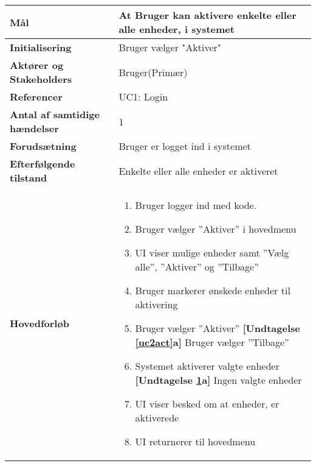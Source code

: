 \begin{table}[H] \centering
	\begin{tabular} {|p{6cm}|p{8cm}|}
	\hline		
		\textbf{Mål}							&At Bruger kan aktivere enkelte eller alle enheder, i systemet\\\hline
		\textbf{Initialisering}				&Bruger vælger "Aktiver" 	\\\hline
		\textbf{Aktører og Stakeholders}		&Bruger(Primær) 				\\\hline
		\textbf{Referencer}					&UC1: Login					\\\hline
		\textbf{Antal af samtidige hændelser}&1 							\\\hline
		\textbf{Forudsætning}				&Bruger er logget ind i systemet\\\hline
		\textbf{Efterfølgende tilstand}		&Enkelte eller alle enheder er aktiveret  \\\hline
		\textbf{Hovedforløb}					
			&\begin{enumerate}
	
				\item \label{uc2login} Bruger logger ind med kode.
					
				\item Bruger vælger ''Aktiver'' i hovedmenu
										
				\item \label{uc2menu}UI viser mulige enheder samt ''Vælg alle'', ''Aktiver'' og ''Tilbage''
												
				\item Bruger markerer ønskede enheder til aktivering
												
				\item \label{uc2act} Bruger vælger ''Aktiver''\newline
					\textbf{[Undtagelse \ref{uc2act}a]} Bruger vælger ''Tilbage''
												
				\item \label{uc2sysact} Systemet aktiverer valgte enheder \newline
					\textbf{[Undtagelse \ref{uc2sysact}a]} Ingen valgte enheder
				
				\item UI viser besked om at enheder, er aktiverede
																	
				\item UI returnerer til hovedmenu
												
			\end{enumerate}\\ \hline
		

\end{tabular}
\end{table}
